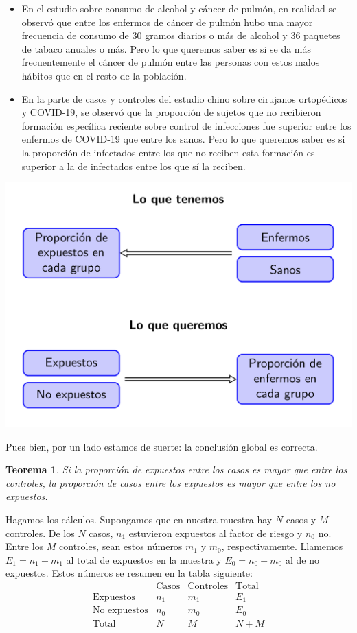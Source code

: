 \documentclass[
]{book}
\newtheorem{theorem}{Teorema}[chapter]
\theoremstyle{definition}
\theoremstyle{definition}
\theoremstyle{definition}
\theoremstyle{definition}
\theoremstyle{remark}
\begin{document}
\begin{itemize}
\item
  En el estudio sobre consumo de alcohol y cáncer de pulmón, en realidad se observó que entre los enfermos de cáncer de pulmón hubo una mayor frecuencia de consumo de 30 gramos diarios o más de alcohol y 36 paquetes de tabaco anuales o más. Pero lo que queremos saber es si se da más frecuentemente el cáncer de pulmón entre las personas con estos malos hábitos que en el resto de la población.
\item
  En la parte de casos y controles del estudio chino sobre cirujanos ortopédicos y COVID-19, se observó que la proporción de sujetos que no recibieron formación específica reciente sobre control de infecciones fue superior entre los enfermos de COVID-19 que entre los sanos. Pero lo que queremos saber es si la proporción de infectados entre los que no reciben esta formación es superior a la de infectados entre los que sí la reciben.
\end{itemize}

\begin{center}\includegraphics[width=0.8\linewidth]{INREMDN_files/figure-html/queremos} \end{center}

Pues bien, por un lado estamos de suerte: la conclusión global es correcta.

\begin{theorem}
\protect\hypertarget{thm:buensentido}{}\label{thm:buensentido}Si la proporción de expuestos entre los casos es mayor que entre los controles, la proporción de casos entre los expuestos es mayor que entre los no expuestos.
\end{theorem}

Hagamos los cálculos. Supongamos que en nuestra muestra hay \(N\) casos y \(M\) controles. De los \(N\) casos, \(n_1\) estuvieron expuestos al factor de riesgo y \(n_0\) no. Entre los \(M\) controles, sean estos números \(m_1\) y \(m_0\), respectivamente. Llamemos \(E_1=n_1+m_1\) al total de expuestos en la muestra y \(E_0=n_0+m_0\) al de no expuestos. Estos números se resumen en la tabla siguiente:
\[
\begin{array}{r|c|c|c}
& \text{Casos} & \text{Controles} & \text{Total} \\ \hline
\text{Expuestos} & n_1 & m_1 & E_1\\ \hline
\text{No expuestos} & n_0 & m_0 & E_0\\ \hline
\text{Total} & N & M & N+M
\end{array}
\]
\end{document}
